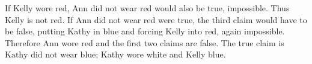 If Kelly wore red, Ann did not wear red would also be true, impossible. Thus Kelly is not red. If Ann did not wear red were true, the third claim would have to be false, putting Kathy in blue and forcing Kelly into red, again impossible. Therefore Ann wore red and the first two claims are false. The true claim is $\boxed{\text{Kathy did not wear blue}}$; Kathy wore white and Kelly blue.
